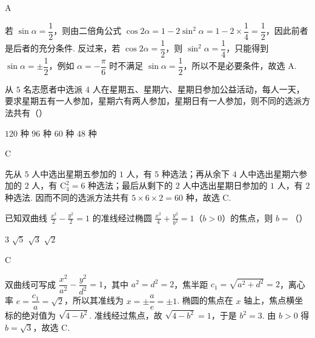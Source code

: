 \begin{answer}
A
\end{answer}

\begin{solution}
若 \(\sin\alpha=\dfrac{1}{2}\)，则由二倍角公式 \(\cos2\alpha=1-2\sin^2\alpha=1-2\times\dfrac{1}{4}=\dfrac{1}{2}\)，因此前者是后者的充分条件. 反过来，若 \(\cos2\alpha=\dfrac{1}{2}\)，则 \(\sin^2\alpha=\dfrac{1}{4}\)，只能得到 \(\sin\alpha=\pm\dfrac{1}{2}\)，例如 \(\alpha=-\dfrac{\pi}{6}\) 时不满足 \(\sin\alpha=\dfrac{1}{2}\)，所以不是必要条件，故选 A.
\end{solution}

\begin{problem}
从 \(5\) 名志愿者中选派 \(4\) 人在星期五、星期六、星期日参加公益活动，每人一天，要求星期五有一人参加，星期六有两人参加，星期日有一人参加，则不同的选派方法共有（\quad）

\choices
    {\(120\text{ 种}\)}
    {\(96\text{ 种}\)}
    {\(60\text{ 种}\)}
    {\(48\text{ 种}\)}
\end{problem}

\begin{answer}
C
\end{answer}

\begin{solution}
先从 \(5\) 人中选出星期五参加的 \(1\) 人，有 \(5\) 种选法；再从余下 \(4\) 人中选出星期六参加的 \(2\) 人，有 \(\mathrm C_4^2=6\) 种选法；最后从剩下的 \(2\) 人中选出星期日参加的 \(1\) 人，有 \(2\) 种选法. 因而不同的选派方法共有 \(5\times6\times2=60\) 种，故选 C.
\end{solution}

\begin{problem}
已知双曲线 \(\frac{x^2}{2} - \frac{y^2}{2} = 1\) 的准线经过椭圆 \(\frac{x^2}{4} + \frac{y^2}{b^2} = 1\)（\(b > 0\)）的焦点，则 \(b =\)（\quad）

\choices
    {\(3\)}
    {\(\sqrt{5}\)}
    {\(\sqrt{3}\)}
    {\(\sqrt{2}\)}
\end{problem}

\begin{answer}
C
\end{answer}

\begin{solution}
双曲线可写成 \(\dfrac{x^2}{a^2}-\dfrac{y^2}{d^2}=1\)，其中 \(a^2=d^2=2\)，焦半距 \(c_1=\sqrt{a^2+d^2}=2\)，离心率 \(e=\dfrac{c_1}{a}=\sqrt2\)，所以其准线为 \(x=\pm\dfrac{a}{e}=\pm1\). 椭圆的焦点在 \(x\) 轴上，焦点横坐标的绝对值为 \(\sqrt{4-b^2}\). 准线经过焦点，故 \(\sqrt{4-b^2}=1\)，于是 \(b^2=3\). 由 \(b>0\) 得 \(b=\sqrt3\)，故选 C.
\end{solution}

